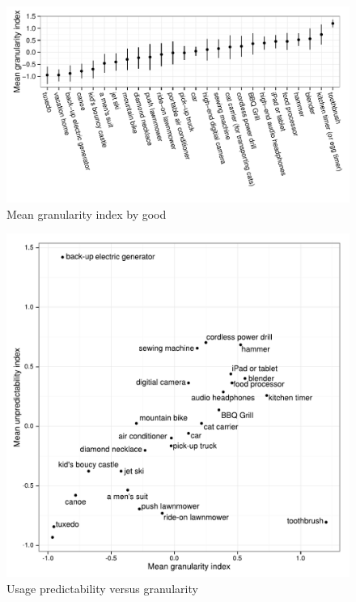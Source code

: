 \documentclass[11pt]{article}
\begin{document}
\begin{figure}
\centering 
\caption{Mean granularity index by good \label{fig:granularity}}
\begin{minipage}{0.90 \linewidth}
\includegraphics[width = \linewidth]{./plots/granularity.pdf} 
\end{minipage} 
\end{figure} 

\begin{figure}
\centering 
\caption{Usage predictability versus granularity \label{fig:granularity_v_predictability}}
\begin{minipage}{0.90 \linewidth}
\includegraphics[width = \linewidth]{./plots/granularity_versus_predictability.pdf} 
\end{minipage} 
\end{figure} 
\end{document}
